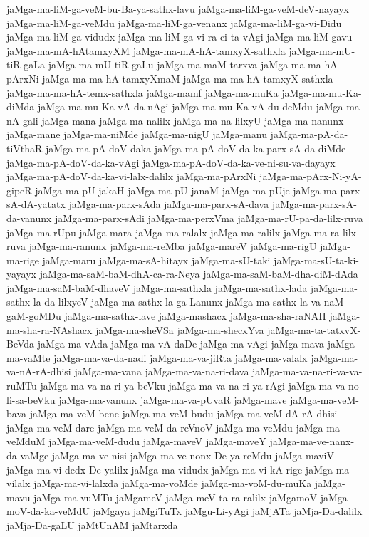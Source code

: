 {jaMga-ma-liM-ga-veM-bu-Ba-ya-sathx-lavu
jaMga-ma-liM-ga-veM-deV-nayayx
jaMga-ma-liM-ga-veMdu
jaMga-ma-liM-ga-venanx
jaMga-ma-liM-ga-vi-Didu
jaMga-ma-liM-ga-vidudx
jaMga-ma-liM-ga-vi-ra-ci-ta-vAgi
jaMga-ma-liM-gavu
jaMga-ma-mA-hAtamxyXM
jaMga-ma-mA-hA-tamxyX-sathxla
jaMga-ma-mU-tiR-gaLa
jaMga-ma-mU-tiR-gaLu
jaMga-ma-maM-tarxva
jaMga-ma-ma-hA-pArxNi
jaMga-ma-ma-hA-tamxyXmaM
jaMga-ma-ma-hA-tamxyX-sathxla
jaMga-ma-ma-hA-temx-sathxla
jaMga-mamf
jaMga-ma-muKa
jaMga-ma-mu-Ka-diMda
jaMga-ma-mu-Ka-vA-da-nAgi
jaMga-ma-mu-Ka-vA-du-deMdu
jaMga-ma-nA-gali
jaMga-mana
jaMga-ma-nalilx
jaMga-ma-na-lilxyU
jaMga-ma-nanunx
jaMga-mane
jaMga-ma-niMde
jaMga-ma-nigU
jaMga-manu
jaMga-ma-pA-da-tiVthaR
jaMga-ma-pA-doV-daka
jaMga-ma-pA-doV-da-ka-parx-sA-da-diMde
jaMga-ma-pA-doV-da-ka-vAgi
jaMga-ma-pA-doV-da-ka-ve-ni-su-va-dayayx
jaMga-ma-pA-doV-da-ka-vi-lalx-dalilx
jaMga-ma-pArxNi
jaMga-ma-pArx-Ni-yA-gipeR
jaMga-ma-pU-jakaH
jaMga-ma-pU-janaM
jaMga-ma-pUje
jaMga-ma-parx-sA-dA-yatatx
jaMga-ma-parx-sAda
jaMga-ma-parx-sA-dava
jaMga-ma-parx-sA-da-vanunx
jaMga-ma-parx-sAdi
jaMga-ma-perxVma
jaMga-ma-rU-pa-da-lilx-ruva
jaMga-ma-rUpu
jaMga-mara
jaMga-ma-ralalx
jaMga-ma-ralilx
jaMga-ma-ra-lilx-ruva
jaMga-ma-ranunx
jaMga-ma-reMba
jaMga-mareV
jaMga-ma-rigU
jaMga-ma-rige
jaMga-maru
jaMga-ma-sA-hitayx
jaMga-ma-sU-taki
jaMga-ma-sU-ta-ki-yayayx
jaMga-ma-saM-baM-dhA-ca-ra-Neya
jaMga-ma-saM-baM-dha-diM-dAda
jaMga-ma-saM-baM-dhaveV
jaMga-ma-sathxla
jaMga-ma-sathx-lada
jaMga-ma-sathx-la-da-lilxyeV
jaMga-ma-sathx-la-ga-Lanunx
jaMga-ma-sathx-la-va-naM-gaM-goMDu
jaMga-ma-sathx-lave
jaMga-mashacx
jaMga-ma-sha-raNAH
jaMga-ma-sha-ra-NAshacx
jaMga-ma-sheVSa
jaMga-ma-shecxYva
jaMga-ma-ta-tatxvX-BeVda
jaMga-ma-vAda
jaMga-ma-vA-daDe
jaMga-ma-vAgi
jaMga-mava
jaMga-ma-vaMte
jaMga-ma-va-da-nadi
jaMga-ma-va-jiRta
jaMga-ma-valalx
jaMga-ma-va-nA-rA-dhisi
jaMga-ma-vana
jaMga-ma-va-na-ri-dava
jaMga-ma-va-na-ri-va-va-ruMTu
jaMga-ma-va-na-ri-ya-beVku
jaMga-ma-va-na-ri-ya-rAgi
jaMga-ma-va-no-li-sa-beVku
jaMga-ma-vanunx
jaMga-ma-va-pUvaR
jaMga-mave
jaMga-ma-veM-bava
jaMga-ma-veM-bene
jaMga-ma-veM-budu
jaMga-ma-veM-dA-rA-dhisi
jaMga-ma-veM-dare
jaMga-ma-veM-da-reVnoV
jaMga-ma-veMdu
jaMga-ma-veMduM
jaMga-ma-veM-dudu
jaMga-maveV
jaMga-maveY
jaMga-ma-ve-nanx-da-vaMge
jaMga-ma-ve-nisi
jaMga-ma-ve-nonx-De-ya-reMdu
jaMga-maviV
jaMga-ma-vi-dedx-De-yalilx
jaMga-ma-vidudx
jaMga-ma-vi-kA-rige
jaMga-ma-vilalx
jaMga-ma-vi-lalxda
jaMga-ma-voMde
jaMga-ma-voM-du-muKa
jaMga-mavu
jaMga-ma-vuMTu
jaMgameV
jaMga-meV-ta-ra-ralilx
jaMgamoV
jaMga-moV-da-ka-veMdU
jaMgaya
jaMgiTuTx
jaMgu-Li-yAgi
jaMjATa
jaMja-Da-dalilx
jaMja-Da-gaLU
jaMtUnAM
jaMtarxda
}
